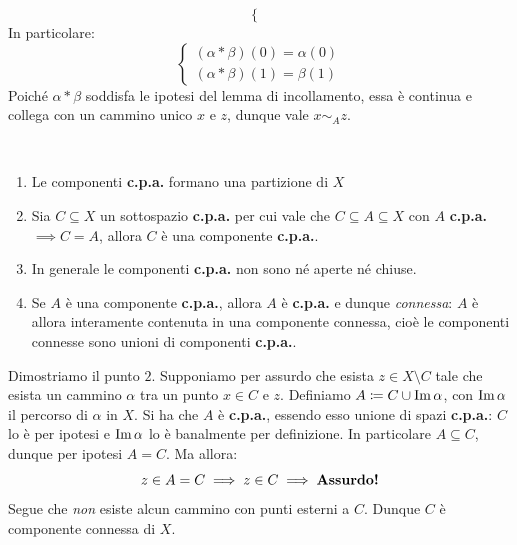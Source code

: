 \begin{demonstration}
\begin{itemize}
\begin{equation}
\begin{cases}
	\end{cases}
\end{equation}
In particolare:
\begin{equation*}
	\begin{cases}
	\left(\alpha\ast\beta\right)\left(0\right)=\alpha\left(0\right)\\
	\left(\alpha\ast\beta\right)\left(1\right)=\beta\left(1\right)
		\end{cases}
\end{equation*}
Poiché $\alpha\ast\beta$ soddisfa le ipotesi del lemma di incollamento, essa è continua e collega con un cammino unico $x$ e $z$, dunque vale $x\sim_A z$.
	\end{itemize}
\end{demonstration}
\begin{observes}~{}
	\begin{enumerate}
		\item Le componenti \textbf{c.p.a.} formano una partizione di $X$
		\item Sia $C\subseteq X$ un sottospazio \textbf{c.p.a.} per cui vale che $C\subseteq A\subseteq X$ con $A$ \textbf{c.p.a.}$\implies C=A$, allora $C$ è una componente \textbf{c.p.a.}.
		\item In generale le componenti \textbf{c.p.a.} non sono né aperte né chiuse.
		\item Se $A$ è una componente \textbf{c.p.a.}, allora $A$ è \textbf{c.p.a.} e dunque \textit{connessa}: $A$ è allora interamente contenuta in una componente connessa, cioè le componenti connesse sono unioni di componenti \textbf{c.p.a.}.
	\end{enumerate}
\vspace{-3mm}
\end{observes}
\begin{demonstration}
	Dimostriamo il punto $2$. Supponiamo per assurdo che esista $z\in X\setminus C$ tale che esista un cammino $\alpha$ tra un punto $x\in C$ e $z$. Definiamo $A\coloneqq C\cup \operatorname{Im} \alpha$, con $\operatorname{Im} \alpha$ il percorso di $\alpha$ in $X$. Si ha che $A$ è \textbf{c.p.a.}, essendo esso unione di spazi \textbf{c.p.a.}: $C$ lo è per ipotesi e $\operatorname{Im} \alpha$ lo è banalmente per definizione. In particolare $A\subseteq C$, dunque per ipotesi $A=C$. Ma allora:
	\begin{equation*}
		z\in A=C\implies z\in C\implies\text{\textbf{Assurdo!}}
	\end{equation*}
	Segue che \textit{non} esiste alcun cammino con punti esterni a $C$. Dunque $C$ è componente connessa di $X$.
\end{demonstration}
